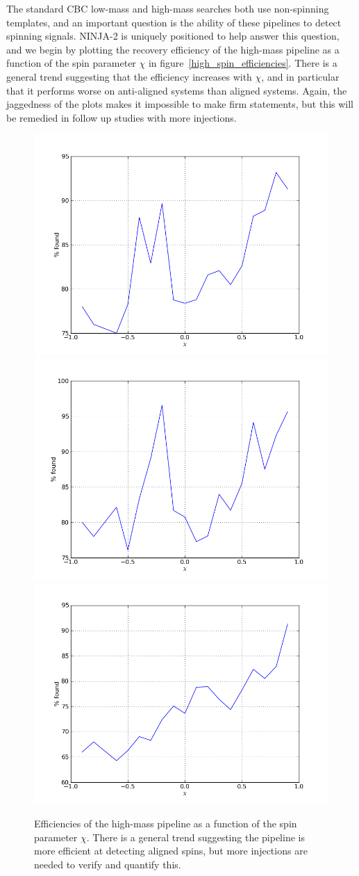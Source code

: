 The standard CBC low-mass and high-mass searches both use non-spinning
templates, and an important question is the ability of these pipelines
to detect spinning signals.  NINJA-2 is uniquely positioned to help
answer this question, and we begin by plotting the recovery efficiency
of the high-mass pipeline as a function of the spin parameter $\chi$
in figure~\ref{high_spin_efficiencies}.  There is a general trend
suggesting that the efficiency increases with $\chi$, and in
particular that it performs worse on anti-aligned systems than aligned
systems.  Again, the jaggedness of the plots makes it impossible to
make firm statements, but this will be remedied in follow up studies
with more injections.



\begin{figure}
  \includegraphics[width=0.5\linewidth]{figures/ninja2_results/H_second_spin_high_efficiency}
  \includegraphics[width=0.5\linewidth]{figures/ninja2_results/L_second_spin_high_efficiency} \\
  \includegraphics[width=0.5\linewidth]{figures/ninja2_results/V_second_spin_high_efficiency}
  \caption[Efficiency of the high-mass pipeline as a function of mass]{
  \label{f:high_spin_efficiencies}
Efficiencies of the high-mass pipeline as a function of the spin
parameter $\chi$.  There is a general trend suggesting the pipeline
is more efficient at detecting aligned spins, but more injections are
needed to verify and quantify this.
}
\end{figure}%

